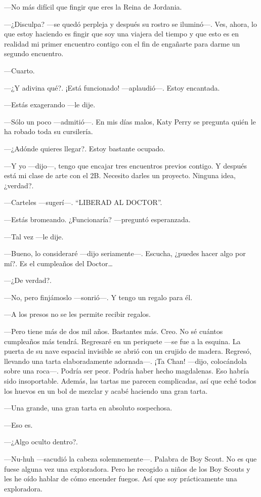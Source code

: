 ---No más difícil que fingir que eres la Reina de Jordania.

---¿Disculpa? ---se quedó perpleja y después su rostro se iluminó---.
Ves, ahora, lo que estoy haciendo es fingir que soy una viajera del
tiempo y que esto es en realidad mi primer encuentro contigo con el fin
de engañarte para darme un segundo encuentro.

---Cuarto.

---¿Y adivina qué?. ¡Está funcionado! ---aplaudió---. Estoy encantada.

---Estás exagerando ---le dije.

---Sólo un poco ---admitió---. En mis días malos, Katy Perry se pregunta
quién le ha robado toda su cursilería.

---¿Adónde quieres llegar?. Estoy bastante ocupado.

---Y yo ---dijo---, tengo que encajar tres encuentros previos contigo. Y
después está mi clase de arte con el 2B. Necesito darles un proyecto.
Ninguna idea, ¿verdad?.

---Carteles ---sugerí---. ``LIBERAD AL DOCTOR''.

---Estás bromeando. ¿Funcionaría? ---preguntó esperanzada.

---Tal vez ---le dije.

---Bueno, lo consideraré ---dijo seriamente---. Escucha, ¿puedes hacer
algo por mí?. Es el cumpleaños del Doctor\ldots{}

---¿De verdad?.

---No, pero finjámoslo ---sonrió---. Y tengo un regalo para él.

---A los presos no se les permite recibir regalos.

---Pero tiene más de dos mil años. Bastantes más. Creo. No sé cuántos
cumpleaños más tendrá. Regresaré en un periquete ---se fue a la esquina.
La puerta de su nave espacial invisible se abrió con un crujido de
madera. Regresó, llevando una tarta elaboradamente adornada---. ¡Ta
Chan! ---dijo, colocándola sobre una roca---. Podría ser peor. Podría
haber hecho magdalenas. Eso habría sido insoportable. Además, las tartas
me parecen complicadas, así que eché todos los huevos en un bol de
mezclar y acabé haciendo una gran tarta.

---Una grande, una gran tarta en absoluto sospechosa.

---Eso es.

---¿Algo oculto dentro?.

---Nu-huh ---sacudió la cabeza solemnemente---. Palabra de Boy Scout. No
es que fuese alguna vez una exploradora. Pero he recogido a niños de los
Boy Scouts y les he oído hablar de cómo encender fuegos. Así que soy
prácticamente una exploradora.

